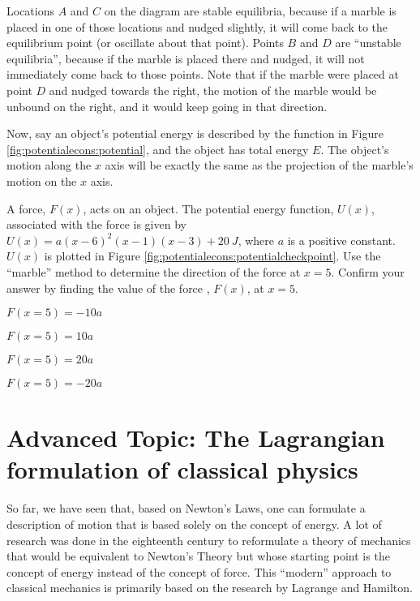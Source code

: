Locations $A$ and $C$ on the diagram are stable equilibria, because if a marble is placed in one of those locations and nudged slightly, it will come back to the equilibrium point (or oscillate about that point). Points $B$ and $D$ are ``unstable equilibria'', because if the marble is placed there and nudged, it will not immediately come back to those points. Note that if the marble were placed at point $D$ and nudged towards the right, the motion of the marble would be unbound on the right, and it would keep going in that direction. 


Now, say an object's potential energy is described by the function in Figure \ref{fig:potentialecons:potential}, and the object has total energy $E$. The object's motion along the $x$ axis will be exactly the same as the projection of the marble's motion on the $x$ axis.

\begin{checkpoint}
\begin{MCquestion}{A force, $F(x)$, acts on an object. The potential energy function, $U(x)$, associated with the force is given by $U(x)=a(x-6)^2(x-1)(x-3)+\SI{20}{J}$, where $a$ is a positive constant. $U(x)$ is plotted in Figure \ref{fig:potentialecons:potentialcheckpoint}. Use the ``marble'' method to determine the direction of the force at $x=5$. Confirm your answer by finding the value of the force , $F(x)$, at $x=5$.
}
\item $F(x=5)=-10a$
\item $F(x=5)=10a$\correct
\item $F(x=5)=20a$
\item $F(x=5)=-20a$
\end{MCquestion}

\end{checkpoint}

\section{Advanced Topic: The Lagrangian formulation of classical physics}
So far, we have seen that, based on Newton's Laws, one can formulate a description of motion that is based solely on the concept of energy. A lot of research was done in the eighteenth century to reformulate a theory of mechanics that would be equivalent to Newton's Theory but whose starting point is the concept of energy instead of the concept of force. This ``modern'' approach to classical mechanics is primarily based on the research by Lagrange and Hamilton. 

